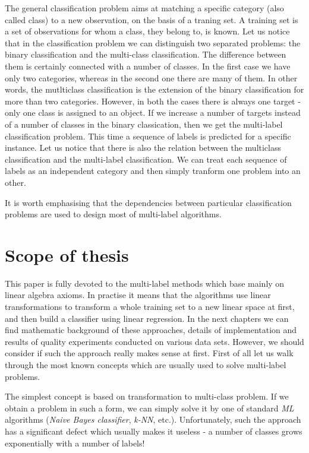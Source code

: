 The general classification problem aims at matching a specific category (also called class) to a new observation, on the basis of a traning set. A training set is a set of observations for whom a class, they belong to, is known. Let us notice that in the classification problem we can distinguish two separated problems: the binary classification and the multi-class classification. The difference between them is certainly connected with a number of classes. In the first case we have only two categories, whereas in the second one there are many of them. In other words, the mutlticlass classification is the extension of the binary classification for more than two categories. However, in both the cases there is always one target - only one class is assigned to an object. If we increase a number of targets instead of a number of classes in the binary classication, then we get the multi-label classification problem. This time a sequence of labels is predicted for a specific instance. Let us notice that there is also the relation between the multiclass classification and the multi-label classification. We can treat each sequence of labels as an independent category and then simply tranform one problem into an other. 

It is worth emphasising that the dependencies between particular classification problems are used to design most of multi-label algorithms. 

\section{Scope of thesis}

This paper is fully devoted to the multi-label methods which base mainly on linear algebra axioms. In practise it means that the algorithms use linear transformations to transform a whole training set to a new linear space at first, and then build a classifier using linear regression. In the next chapters we can find mathematic background of these approaches, details of implementation and results of quality experiments conducted on various data sets. However, we should consider if such the approach really makes sense at first. First of all let us walk through the most known concepts which are usually used to solve multi-label problems.

The simplest concept is based on transformation to multi-class problem. If we obtain a problem in such a form, we can simply solve it by one of standard \textit{ML} algorithms (\textit{Naive Bayes classifier}, \textit{k-NN}, etc.). Unfortunately, such the approach has a significant defect which usually makes it useless - a number of classes grows exponentially with a number of labels!

